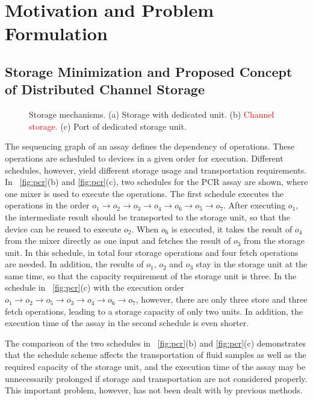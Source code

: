 
\section{Motivation and Problem Formulation}\label{sec:motivation}

\subsection{Storage Minimization and Proposed Concept of Distributed Channel Storage}

\begin{figure}[t]
{\figurefontsize
\centering

\caption{Storage mechanisms. (a) Storage with dedicated unit. (b) \textcolor{red}{Channel
storage.} (c) Port of dedicated storage unit.}
\label{fig:device_storage}
}
\end{figure}

The sequencing graph of an assay defines the dependency of operations. These
operations are scheduled to devices in a given order for execution. Different
schedules, however, yield different storage usage and transportation
requirements.
%
In \figname~\ref{fig:pcr}(b) and \ref{fig:pcr}(c), two schedules
for the PCR assay are shown, where one mixer is used to execute the
operations. The first schedule executes the operations in the order
$o_1\to o_2\to o_3 \to o_4 \to o_6 \to o_5\to o_7$. After executing $o_1$, the
intermediate result should be transported to the storage unit, so that the device
can be reused to execute $o_2$. When $o_6$ is executed, it takes the result of
$o_4$ from the mixer directly as one input and fetches the result of $o_3$
from the storage unit. In this schedule, in total four storage operations
and four fetch operations are needed. In addition, the results of $o_1$,
$o_2$ and $o_3$ stay in the storage unit at the same time, so that the
capacity requirement of the storage unit is three.
In the schedule in \figname~\ref{fig:pcr}(c) with the execution order
$o_1\to o_2\to o_5 \to o_3 \to o_4 \to o_6\to o_7$,
however, there are only three store and three fetch operations,
leading to a storage capacity of only two units.
In addition, the execution
time of the assay in the second schedule is even shorter.

The comparison of the two schedules in \figname~\ref{fig:pcr}(b) and
\ref{fig:pcr}(c) demonstrates that the schedule scheme affects the
transportation of fluid samples as well as the required capacity of the storage unit,
and the execution time of the assay may be unnecessarily prolonged if storage
and transportation are not considered properly.
This important problem, however, has not been dealt with by previous
methods.


